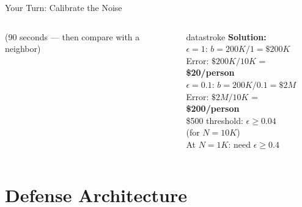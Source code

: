 \documentclass[aspectratio=169, 12pt]{beamer}
\begin{document}
\begin{frame}{Your Turn: Calibrate the Noise}
\begin{columns}[T]
\begin{column}{0.55\textwidth}
    {\footnotesize\textcolor{midgray}{(90 seconds --- then compare with a neighbor)}}
  \end{column}
  \begin{column}{0.42\textwidth}
    \pause
    \begin{mlsyscard}{datastroke}
    \textbf{Solution:}\\[0.1cm]
    {\footnotesize
    $\epsilon=1$: $b = 200K/1 = \$200K$\\
    Error: $\$200K / 10K$ = \textcolor{datastroke}{\textbf{\$20/person}}\\[0.1cm]
    $\epsilon=0.1$: $b = 200K/0.1 = \$2M$\\
    Error: $\$2M / 10K$ = \textcolor{routingstroke}{\textbf{\$200/person}}\\[0.1cm]
    \$500 threshold: $\epsilon \geq 0.04$\\
    (for $N=10K$)\\[0.1cm]
    \textcolor{errorstroke}{At $N=1K$: need $\epsilon \geq 0.4$}
    }
    \end{mlsyscard}
  \end{column}
\end{columns}

\end{frame}

\section{Defense Architecture}
\end{document}
